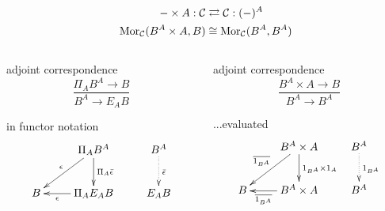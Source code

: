 \begin{frame}[t]
\begin{block}{}
\abovedisplayskip=0pt
\begin{align*}
- \times A: \mathcal{C} & \rightleftarrows \mathcal{C}: (-)^A\\
\mathop{\rm Mor}\nolimits_{\mathcal{C}}(B^A \times A, B) & \cong  \mathop{\rm Mor}\nolimits_{\mathcal{C}}(B^A, B^A)
\end{align*}
\end{block}
\begin{columns}[t]
    \begin{column}{0.5\textwidth}
    		\begin{block}{adjoint correspondence}
		\abovedisplayskip=0pt
		$$
			\frac{ \Pi_A B^A \longrightarrow B}{B^A \longrightarrow E_A B}
		$$
		\end{block}	
\begin{block}{in functor notation}
			$$
			\xymatrix{
			& \Pi_A B^A \ar[d]^{\Pi_A \bar{\epsilon}} \ar[dl]_{\epsilon} & B^A \ar@{.>}[d]^{\bar{\epsilon}}\\
			B & \Pi_A E_A B \ar[l]^-{\epsilon} & E_A B}
			$$
		\end{block}
    \end{column}
    \begin{column}{0.5\textwidth}
		\begin{block}{adjoint correspondence}
		\abovedisplayskip=0pt
		$$
			\frac{B^A \times A \longrightarrow B}{B^A \longrightarrow B^A}
		$$
		\end{block}
		\begin{block}{...evaluated}
			$$
			\xymatrix{
			& B^A \times A \ar[d]^{1_{B^A} \times 1_A} \ar[dl]_{\overline{1_{B^A}}} & B^A \ar@{.>}[d]^{1_{B^A}}\\
			B & B^A \times A \ar[l]^-{\overline{1_{B^A}}} & B^A}
			$$
		\end{block}	
    \end{column}
\end{columns}
\end{frame}


